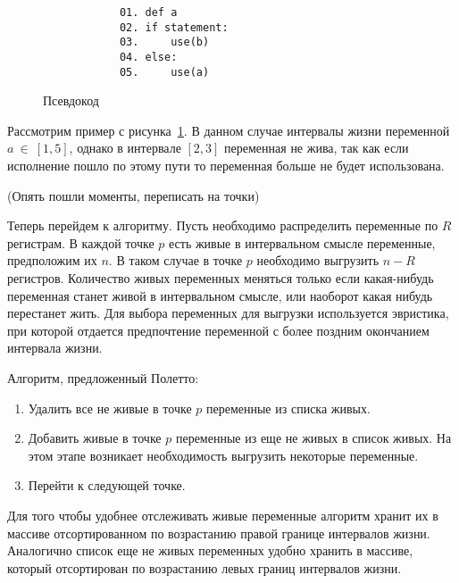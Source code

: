 \begin{example}
    \begin{figure}[h]
        \centering
        \lstset{basicstyle=\ttfamily\small, frame=single}
        \begin{lstlisting}
            01. def a
            02. if statement:
            03.     use(b)
            04. else:
            05.     use(a)
        \end{lstlisting}
        \caption{Псевдокод}
        \label{fig:example_live_intervals}
    \end{figure}

    Рассмотрим пример с рисунка~\ref{fig:example_live_intervals}. В данном случае интервалы жизни переменной
    $a~\in~[1,5]$, однако в интервале $[2,3]$ переменная не жива, так как если исполнение пошло по этому пути
    то переменная больше не будет использована.
    
\end{example}

(Опять пошли моменты, переписать на точки)

Теперь перейдем к алгоритму. Пусть необходимо распределить переменные по $R$ регистрам. В каждой точке
$p$ есть живые в интервальном смысле переменные, предположим их $n$. В таком случае в точке $p$
необходимо выгрузить $n - R$ регистров. Количество живых переменных меняться только если какая-нибудь
переменная станет живой в интервальном смысле, или наоборот какая нибудь перестанет жить.
Для выбора переменных для выгрузки используется эвристика,
при которой отдается предпочтение переменной с более поздним окончанием интервала жизни.

Алгоритм, предложенный Полетто:

\begin{enumerate}
    \item Удалить все не живые в точке $p$ переменные из списка живых. \label{poleto_alg:delete_death}

    \item Добавить живые в точке $p$ переменные из еще не живых в список живых. На этом этапе
    возникает необходимость выгрузить некоторые переменные. \label{poleto_alg:add_alive}

    \item Перейти к следующей точке.
\end{enumerate}

Для того чтобы удобнее отслеживать живые переменные алгоритм хранит их в массиве отсортированном по
возрастанию правой границе интервалов жизни. Аналогично список еще не живых переменных удобно хранить в массиве,
который отсортирован по возрастанию левых границ интервалов жизни.

